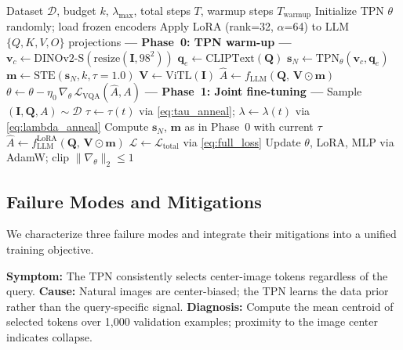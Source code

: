 \documentclass[11pt,a4paper]{article}
\newcommand{\vv}{\mathbf{v}}
\newcommand{\vq}{\mathbf{q}}
\newcommand{\vm}{\mathbf{m}}        %
\newcommand{\vs}{\mathbf{s}}
\newcommand{\mI}{\mathbf{I}}
\newcommand{\mQ}{\mathbf{Q}}
\newcommand{\mV}{\mathbf{V}}
\begin{document}
\begin{algorithm}[t]
\caption{TC-ViTok Training}
\label{alg:training}
\begin{algorithmic}[1]
\Require Dataset $\mathcal{D}$, budget $k$, $\lambda_{\max}$, total steps $T$,
  warmup steps $T_{\mathrm{warmup}}$
\State Initialize TPN $\theta$ randomly; load frozen encoders
\State Apply LoRA (rank=32, $\alpha$=64) to LLM $\{Q,K,V,O\}$ projections
\Statex \textbf{--- Phase~0: TPN warm-up ---}
  \For{$(\mI,\mQ,A)\in\mathcal{D}$}
    \State $\vv_c \gets \mathrm{DINOv2\text{-}S}(\mathrm{resize}(\mI,98^2))$
    \State $\vq_e \gets \mathrm{CLIPText}(\mQ)$
    \State $\vs_N \gets \mathrm{TPN}_\theta(\vv_c,\vq_e)$
    \State $\vm \gets \mathrm{STE}(\vs_N,k,\tau{=}1.0)$
      \hfill {}
    \State $\mV \gets \mathrm{ViTL}(\mI)$
    \State $\hat{A} \gets f_{\mathrm{LLM}}(\mQ,\,\mV\odot\vm)$
    \State $\theta \gets \theta - \eta_0\,\nabla_\theta\,
      \mathcal{L}_{\mathrm{VQA}}(\hat{A},A)$
  \EndFor
\EndFor
\Statex \textbf{--- Phase~1: Joint fine-tuning ---}
  \State Sample $(\mI,\mQ,A)\sim\mathcal{D}$
  \State $\tau\gets\tau(t)$ via \cref{eq:tau_anneal};\quad
    $\lambda\gets\lambda(t)$ via \cref{eq:lambda_anneal}
  \State Compute $\vs_N$, $\vm$ as in Phase~0 with current $\tau$
  \State $\hat{A}\gets f_{\mathrm{LLM}}^{\mathrm{LoRA}}(\mQ,\,\mV\odot\vm)$
  \State $\mathcal{L}\gets\mathcal{L}_{\mathrm{total}}$ via \cref{eq:full_loss}
  \State Update $\theta$, LoRA, MLP via AdamW; clip $\|\nabla_\theta\|_2\leq1$
\EndFor
\end{algorithmic}
\end{algorithm}

\subsection{Failure Modes and Mitigations}
\label{subsec:failures}

We characterize three failure modes and integrate their mitigations into a
unified training objective.

\begin{warnbox}[title={Failure Mode 1: Spatial Collapse (Center Bias)}]
\textbf{Symptom:} The TPN consistently selects center-image tokens regardless
of the query. \textbf{Cause:} Natural images are center-biased; the TPN learns
the data prior rather than the query-specific signal. \textbf{Diagnosis:}
Compute the mean centroid of selected tokens over 1{,}000 validation examples;
proximity to the image center indicates collapse.
\end{warnbox}
\end{document}
